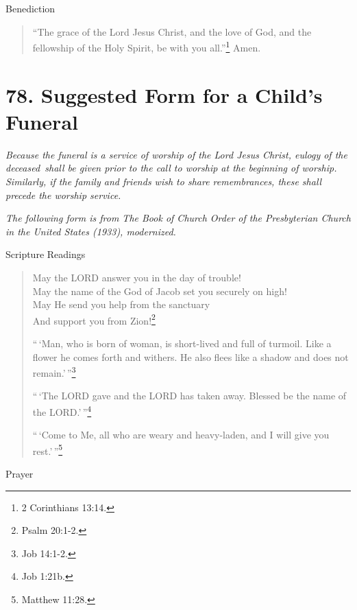 \documentclass[
]{book}
\begin{document}
Benediction

\begin{quote}
``The grace of the Lord Jesus Christ, and the love of God, and the fellowship of the Holy Spirit, be with you all.''\footnote{2 Corinthians 13:14.} Amen.
\end{quote}

\hypertarget{suggested-form-for-a-childs-funeral}{%
\section*{78. Suggested Form for a Child's Funeral}\label{suggested-form-for-a-childs-funeral}}

\protect\hypertarget{chapter-slug-78-suggested-form-for-a-childs-funeral}{\href{}{}}

\protect\hypertarget{78}{\href{}{}}\emph{Because the funeral is a service of worship of the Lord Jesus Christ, eulogy of the deceased~shall be given prior to the call to worship at the beginning of worship. Similarly, if the family and friends wish to share remembrances, these shall precede the worship service.}

\emph{The following form is from The Book of Church Order of the Presbyterian Church in the United States (1933), modernized.}

Scripture Readings

\begin{quote}
May the LORD answer you in the day of trouble!\\
May the name of the God of Jacob set you securely on high!\\
May He send you help from the sanctuary\\
And support you from Zion!\footnote{Psalm 20:1-2.}

``\,`Man, who is born of woman, is short-lived and full of turmoil. Like a flower he comes forth and withers. He also flees like a shadow and does not remain.'\,''\footnote{Job 14:1-2.}

``\,`The LORD gave and the LORD has taken away. Blessed be the name of the LORD.'\,''\footnote{Job 1:21b.}

``\,`Come to Me, all who are weary and heavy-laden, and I will give you rest.'\,''\footnote{Matthew 11:28.}
\end{quote}

Prayer
\end{document}
